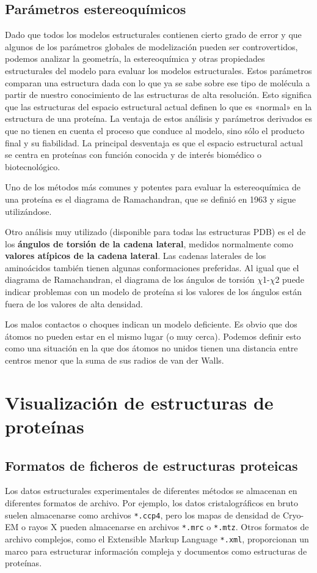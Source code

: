 \subsection{Parámetros estereoquímicos}
Dado que todos los modelos estructurales contienen cierto grado de error y que algunos de los parámetros globales de modelización pueden ser controvertidos, podemos analizar la geometría, la estereoquímica y otras propiedades estructurales del modelo para evaluar los modelos estructurales. Estos parámetros comparan una estructura dada con lo que ya se sabe sobre ese tipo de molécula a partir de nuestro conocimiento de las estructuras de alta resolución. Esto significa que las estructuras del espacio estructural actual definen lo que es «normal» en la estructura de una proteína. La ventaja de estos análisis y parámetros derivados es que no tienen en cuenta el proceso que conduce al modelo, sino sólo el producto final y su fiabilidad. La principal desventaja es que el espacio estructural actual se centra en proteínas con función conocida y de interés biomédico o biotecnológico.

Uno de los métodos más comunes y potentes para evaluar la estereoquímica de una proteína es el diagrama de Ramachandran, que se definió en 1963 y sigue utilizándose.

Otro análisis muy utilizado (disponible para todas las estructuras PDB) es el de los \textbf{ángulos de torsión de la cadena lateral}, medidos normalmente como \textbf{valores atípicos de la cadena lateral}. Las cadenas laterales de los aminoácidos también tienen algunas conformaciones preferidas. Al igual que el diagrama de Ramachandran, el diagrama de los ángulos de torsión $\chi$1-$\chi$2 puede indicar problemas con un modelo de proteína si los valores de los ángulos están fuera de los valores de alta densidad.

Los malos contactos o choques indican un modelo deficiente. Es obvio que dos átomos no pueden estar en el mismo lugar (o muy cerca). Podemos definir esto como una situación en la que dos átomos no unidos tienen una distancia entre centros menor que la suma de sus radios de van der Walls.

\section{Visualización de estructuras de proteínas}
\subsection{Formatos de ficheros de estructuras proteicas}
Los datos estructurales experimentales de diferentes métodos se almacenan en diferentes formatos de archivo. Por ejemplo, los datos cristalográficos en bruto suelen almacenarse como archivos \texttt{*.ccp4}, pero los mapas de densidad de Cryo-EM o rayos X pueden almacenarse en archivos \texttt{*.mrc} o \texttt{*.mtz}. Otros formatos de archivo complejos, como el Extensible Markup Language \texttt{*.xml}, proporcionan un marco para estructurar información compleja y documentos como estructuras de proteínas.

